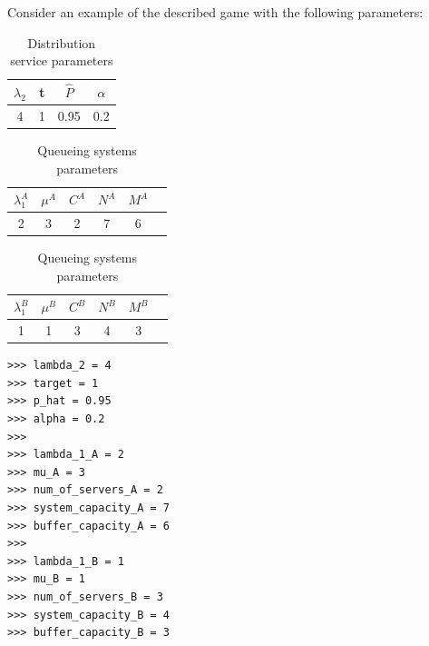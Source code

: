 Consider an example of the described game with the following parameters:

\begin{table}[H]
    \caption{Distribution service parameters}
    \begin{center}
        \begin{tabular}{||c|c|c|c||}
            \hline
            \(\lambda_2\) & t & \footnotesize{\(\hat{P}\)} & \(\alpha\) \\
            \hline\hline
            4 & 1 & 0.95 & 0.2 \\
            \hline
        \end{tabular}
    \end{center}
    \label{tab:implemetation_dist_service_parameters}
\end{table}

\begin{table}[H]
    \caption{Queueing systems parameters}
    \begin{center}
        \begin{tabular}{||c|c|c|c|c|c||}
            \hline
            \(\lambda_1^A\) & \(\mu^A\) & \(C^A\) & \(N^A\) & \(M^A\) \\
            \hline
            2 & 3 & 2 & 7 & 6 \\
            \hline
        \end{tabular}

        \vspace{0.5cm}
        
        \begin{tabular}{||c|c|c|c|c|c||}
            \hline
            \(\lambda_1^B\) & \(\mu^B\) & \(C^B\) & \(N^B\) & \(M^B\) \\
            \hline
            1 & 1 & 3 & 4 & 3 \\
            \hline
        \end{tabular}
    \end{center}
    \label{tab:implemetation_queueing_systems_parameters}
\end{table}


\begin{lstlisting}[style=pystyle]
>>> lambda_2 = 4
>>> target = 1
>>> p_hat = 0.95
>>> alpha = 0.2
>>> 
>>> lambda_1_A = 2
>>> mu_A = 3
>>> num_of_servers_A = 2
>>> system_capacity_A = 7
>>> buffer_capacity_A = 6
>>> 
>>> lambda_1_B = 1
>>> mu_B = 1
>>> num_of_servers_B = 3
>>> system_capacity_B = 4
>>> buffer_capacity_B = 3

\end{lstlisting}


